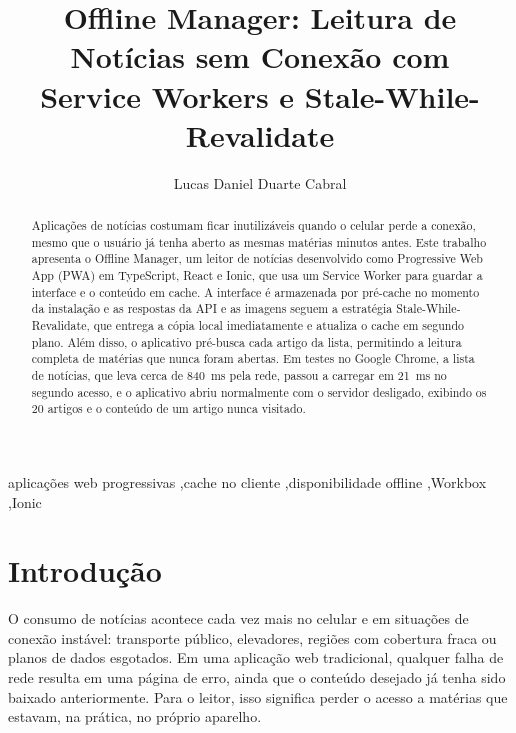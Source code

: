 \documentclass[preprint,10pt,5p]{elsarticle}
\begin{document}
\begin{frontmatter}

\title{Offline Manager: Leitura de Notícias sem Conexão com\\Service Workers e Stale-While-Revalidate}

\address[label1]{Universidade Católica Dom Bosco, Campo Grande, Brazil}

\author[label1]{Lucas Daniel Duarte Cabral}

\begin{abstract}
Aplicações de notícias costumam ficar inutilizáveis quando o celular perde a conexão, mesmo que o usuário já tenha aberto as mesmas matérias minutos antes. Este trabalho apresenta o Offline Manager, um leitor de notícias desenvolvido como Progressive Web App (PWA) em TypeScript, React e Ionic, que usa um Service Worker para guardar a interface e o conteúdo em cache. A interface é armazenada por pré-cache no momento da instalação e as respostas da API e as imagens seguem a estratégia Stale-While-Revalidate, que entrega a cópia local imediatamente e atualiza o cache em segundo plano. Além disso, o aplicativo pré-busca cada artigo da lista, permitindo a leitura completa de matérias que nunca foram abertas. Em testes no Google Chrome, a lista de notícias, que leva cerca de 840~ms pela rede, passou a carregar em 21~ms no segundo acesso, e o aplicativo abriu normalmente com o servidor desligado, exibindo os 20 artigos e o conteúdo de um artigo nunca visitado.
\end{abstract}

\begin{keyword}
aplicações web progressivas \sep cache no cliente \sep disponibilidade offline \sep Workbox \sep Ionic
\end{keyword}

\end{frontmatter}


\section{Introdução}
\label{intro}

O consumo de notícias acontece cada vez mais no celular e em situações de conexão instável: transporte público, elevadores, regiões com cobertura fraca ou planos de dados esgotados. Em uma aplicação web tradicional, qualquer falha de rede resulta em uma página de erro, ainda que o conteúdo desejado já tenha sido baixado anteriormente. Para o leitor, isso significa perder o acesso a matérias que estavam, na prática, no próprio aparelho.
\end{document}
